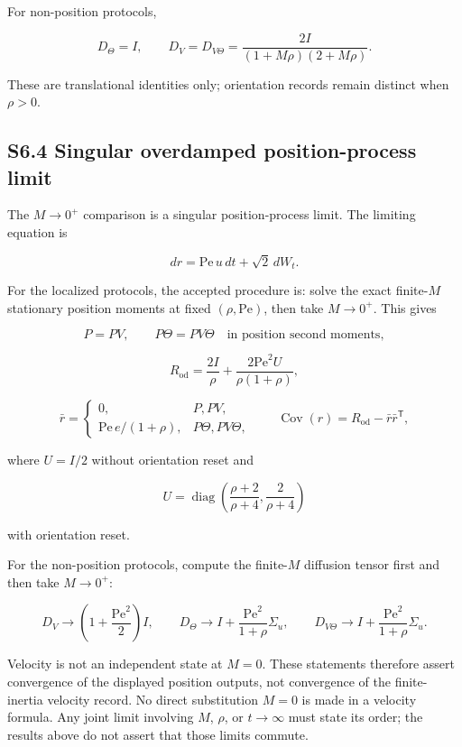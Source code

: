 For non-position protocols,

\[
D_\Theta=I,\qquad
D_V=D_{V\Theta}
=\frac{2I}{(1+M\rho)(2+M\rho)}.
\]

These are translational identities only; orientation records remain distinct when \(\rho>0\).

\subsection{S6.4 Singular overdamped position-process limit}\label{s6.4-singular-overdamped-position-process-limit}

The \(M\to0^+\) comparison is a singular position-process limit. The limiting equation is

\[
dr=\mathrm{Pe}\,u\,dt+\sqrt2\,dW_t.
\]

For the localized protocols, the accepted procedure is: solve the exact finite-\(M\) stationary position moments at fixed \((\rho,\mathrm{Pe})\), then take \(M\to0^+\). This gives

\[
P=PV,\qquad P\Theta=PV\Theta
\quad\text{in position second moments},
\]

\[
R_{\mathrm{od}}
=\frac{2I}{\rho}
+\frac{2\mathrm{Pe}^2U}{\rho(1+\rho)},
\]

\[
\bar r=
\begin{cases}
0,&P,PV,\\[1mm]
\mathrm{Pe}\,e/(1+\rho),&P\Theta,PV\Theta,
\end{cases}
\qquad
\operatorname{Cov}(r)=R_{\mathrm{od}}-\bar r\bar r^\mathsf T,
\]

where \(U=I/2\) without orientation reset and

\[
U=\operatorname{diag}\left(\frac{\rho+2}{\rho+4},
                           \frac{2}{\rho+4}\right)
\]

with orientation reset.

For the non-position protocols, compute the finite-\(M\) diffusion tensor first and then take \(M\to0^+\):

\[
D_V\longrightarrow
\left(1+\frac{\mathrm{Pe}^2}{2}\right)I,
\qquad
D_\Theta\longrightarrow
I+\frac{\mathrm{Pe}^2}{1+\rho}\Sigma_u,
\qquad
D_{V\Theta}\longrightarrow
I+\frac{\mathrm{Pe}^2}{1+\rho}\Sigma_u.
\]

Velocity is not an independent state at \(M=0\). These statements therefore assert convergence of the displayed position outputs, not convergence of the finite-inertia velocity record. No direct substitution \(M=0\) is made in a velocity formula. Any joint limit involving \(M\), \(\rho\), or \(t\to\infty\) must state its order; the results above do not assert that those limits commute.

